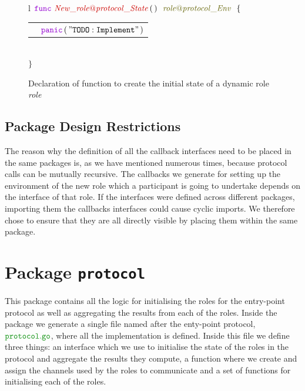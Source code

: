 \documentclass[12pt,twoside]{report}
\begin{document}
\begin{figure}[!h]
    \begin{center}
        \begin{tabular}{l}
            $\gofunc\ \functionname{New\_role@protocol\_State} \, (\,)\ \ \interfacename{\localprotocol{role}{protocol}\_Env}\ \ \{$\\[3pt]

            \begin{tabular}{ll}
                \indent & $\gopanic\,(\,\mathtt{"TODO: Implement"}\,)$\\[3.5pt]
            \end{tabular}\\[3pt]
            $\}$
        \end{tabular}
    \end{center}
    \caption{Declaration of function to create the initial state of a dynamic role \textit{role} }
    \label{protocol-setup-func-gen}
\end{figure}

\subsection{Package Design Restrictions}

The reason why the definition of all the callback interfaces need to be placed in the same packages is, as we have mentioned numerous times, because protocol calls can be mutually recursive. The callbacks we generate for setting up the environment of the new role which a participant is going to undertake depends on the interface of that role. If the interfaces were defined across different packages, importing them the callbacks interfaces could cause cyclic imports. We therefore chose to ensure that they are all directly visible by placing them within the same package.

\section{Package \texttt{protocol}}\label{entry-point}
This package contains all the logic for initialising the roles for the entry-point protocol as well as aggregating the results from each of the roles. Inside the package we generate a single file named after the enty-point protocol, $\filename{protocol}$, where all the implementation is defined. Inside this file we define three things: an interface which we use to initialise the state of the roles in the protocol and aggregate the results they compute, a function where we create and assign the channels used by the roles to communicate and a set of functions for initialising each of the roles.
\end{document}
